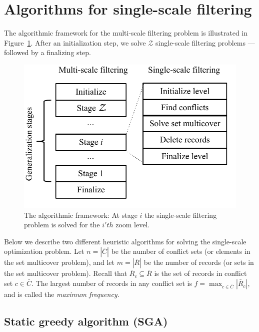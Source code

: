 \section{Algorithms for single-scale filtering}
\label{sec:algorithms}

The algorithmic framework for the multi-scale filtering problem is illustrated in Figure~\ref{fig:algorithmic-framework}. After an initialization step, we solve $\mathcal{Z}$ single-scale filtering problems --- followed by a finalizing step.

\begin{figure}[htbp]
\begin{center}
\includegraphics[scale=.6]{figs/cvl_stages.pdf}
\caption{The algorithmic framework: At stage $i$ the single-scale filtering problem is solved for the $i'th$ zoom level.}
\label{fig:algorithmic-framework}
\end{center}
\end{figure}

Below we describe two different heuristic algorithms for solving the single-scale optimization problem. Let $n=|\bar{C}|$ be the number of conflict sets (or elements in the set multicover problem), and let $m=|\bar{R}|$ be the number of records (or sets in the set multicover problem). Recall that $\bar{R}_c \subseteq \bar{R}$ is the set of records in conflict set $c \in \bar{C}$. The largest number of records in any conflict set is $f = \max_{c \in \bar{C}} |\bar{R}_c|$, and is called the \emph{maximum frequency}.

\subsection{Static greedy algorithm (SGA)}
\label{sec:algorithms:sga}

